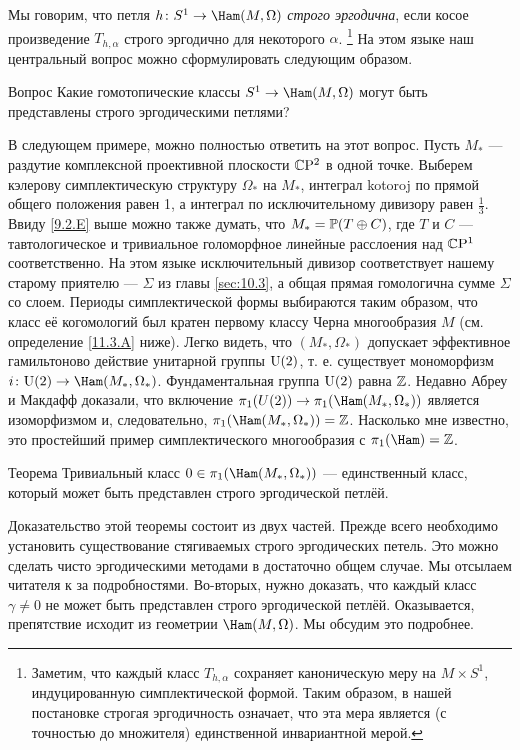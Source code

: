 Мы говорим, что петля $h\: S^1 \to \Ham(M, \Omega)$ \emph{строго
  эргодична}, если косое произведение $T_{h,\alpha}$ строго эргодично
для некоторого $\alpha$.%
\footnote{Заметим, что каждый класс $T_{h,\alpha}$ сохраняет
  каноническую меру на $M \times S^1$, индуцированную симплектической
  формой.
Таким образом, в нашей постановке строгая эргодичность означает, что
эта мера является (с точностью до множителя) единственной инвариантной
мерой.} 
На этом языке наш центральный вопрос можно сформулировать следующим образом.

\begin{ex*}{Вопрос}
Какие гомотопические классы $S^1 \to \Ham(M, \Omega)$ могут быть
представлены строго эргодическими петлями? 
\end{ex*}

В следующем примере, можно полностью ответить на этот вопрос.
Пусть $M_\ast$ --- раздутие комплексной проективной плоскости $\mathbb{C}\mathrm{P}^2$
в одной точке. 
Выберем кэлерову симплектическую структуру $\Omega_\ast$ на $M_\ast$,
интеграл kotoroj по прямой общего положения равен 1, а интеграл по
исключительному дивизору равен $\tfrac13$. 
Ввиду \ref{9.2.E} выше можно также думать, что $M_\ast = \mathbb{P}(T \oplus
C)$, где $T$ и $C$ --- тавтологическое и тривиальное голоморфное
линейные расслоения над $\mathbb{C}\mathrm{P}^1$ соответственно. 
На этом языке исключительный дивизор соответствует нашему старому
приятелю --- $\Sigma$ из главы \ref{sec:10.3}, а общая прямая гомологична
сумме $\Sigma$ со слоем. 
Периоды симплектической формы выбираются таким образом, что класс её
когомологий был кратен первому классу Черна многообразия $M$
(см. определение \ref{11.3.A} ниже). 
Легко видеть, что $(M_\ast, \Omega_\ast)$ допускает эффективное
гамильтоново действие унитарной группы $\mathrm{U}(2)$, т. е. существует
мономорфизм $i\: \U(2) \to \Ham(M_\ast, \Omega_\ast)$. 
Фундаментальная группа $\mathrm{U}(2)$ равна $\mathbb{Z}$.
Недавно Абреу и Макдафф \cite{AM} доказали, что включение $\pi_1(U(2))
\to \pi_1 (\Ham(M_\ast, \Omega_\ast))$ является изоморфизмом и,
следовательно, $\pi_1(\Ham(M_\ast, \Omega_\ast)) = \ZZ$. 
Насколько мне известно, это простейший пример симплектического
многообразия с $\pi_1 (\Ham) = \ZZ$. 

\begin{thm}{Теорема}\label{11.1.A}
Тривиальный класс $0\in\pi_1(\Ham(M_\ast, \Omega_\ast))$ ---
единственный класс, который может быть представлен строго эргодической
петлёй. 
\end{thm}

Доказательство этой теоремы состоит из двух частей.
Прежде всего необходимо установить существование стягиваемых строго
эргодических петель. 
Это можно сделать чисто эргодическими методами в достаточно общем случае.
Мы отсылаем читателя к \cite{P9} за подробностями.
Во-вторых, нужно доказать, что каждый класс $\gamma \ne 0$ не может
быть представлен строго эргодической петлёй. 
Оказывается, препятствие исходит из геометрии $\Ham(M, \Omega)$.
Мы обсудим это подробнее.


